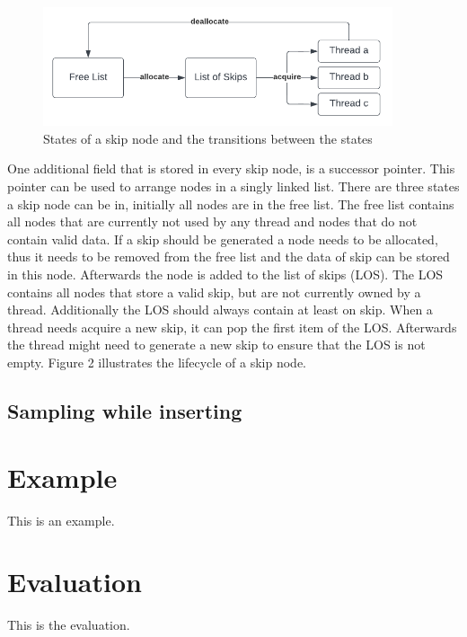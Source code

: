 \documentclass[acmlarge,nonacm]{acmart}
\begin{document}
        \begin{figure}[h]
            \includegraphics[height=3.5cm]{figure2.pdf}
            \caption{States of a skip node and the transitions between the states}
        \end{figure}
        One additional field that is stored in every skip node, is a successor pointer. This pointer can be used to arrange nodes in a singly linked list. There are three states a skip node can be in, initially all nodes are in the free list. The free list contains all nodes that are currently not used by any thread and nodes that do not contain valid data. If a skip should be generated a node needs to be allocated, thus it needs to be removed from the free list and the data of skip can be stored in this node. Afterwards the node is added to the list of skips (LOS). The LOS contains all nodes that store a valid skip, but are not currently owned by a thread. Additionally the LOS should always contain at least on skip. When a thread needs acquire a new skip, it can pop the first item of the LOS. Afterwards the thread might need to generate a new skip to ensure that the LOS is not empty. Figure 2 illustrates the lifecycle of a skip node.

    \subsection{Sampling while inserting}

    \section{Example}
        This is an example.

    \section{Evaluation}
        This is the evaluation.
\end{document}

